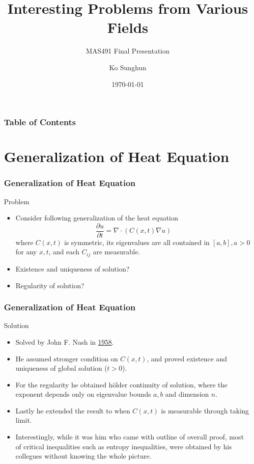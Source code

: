\documentclass{beamer}
\title{Interesting Problems from Various Fields}
\subtitle{MAS491 Final Presentation}
\author{Ko Sunghun}
\institute{KAIST}
\date{\today}
\begin{document}
\begin{frame}
    \titlepage
\end{frame}
\begin{frame}
    \frametitle{Table of Contents}
    \tableofcontents
\end{frame}

\section{Generalization of Heat Equation}
\begin{frame}
    \frametitle{Generalization of Heat Equation}
    \begin{block}{Problem}
        \begin{itemize}
            \item Consider following generalization of the heat equation
            \begin{equation}
                \frac{\partial u}{\partial t} = \nabla \cdot (C(x,t) \nabla u)
            \end{equation}
            where $C(x,t)$ is symmetric, its eigenvalues are all contained in $[a,b], a > 0$ for any $x,t$, and each $C_{ij}$ are measurable.
            \item Existence and uniqueness of solution?
            \item Regularity of solution?
        \end{itemize}
    \end{block}
\end{frame}
\begin{frame}
    \frametitle{Generalization of Heat Equation}
    \begin{block}{Solution}
        \begin{itemize}
            \item Solved by John F. Nash in \href{https://www.karlin.mff.cuni.cz/~kaplicky/pages/pages/2011z/Nash1958.pdf}{1958}.
            \item He assumed stronger condition on $C(x,t)$, and proved existence and uniqueness of global solution ($t > 0$).
            \item For the regularity he obtained h{\"o}lder continuity of solution, where the exponent depends only on eigenvalue bounds $a,b$ and dimension $n$.
            \item Lastly he extended the result to when $C(x,t)$ is measurable through taking limit.
            \item Interestingly, while it was him who came with outline of overall proof, most of critical inequalities such as entropy inequalities, were obtained by his collegues without knowing the whole picture.
        \end{itemize}
    \end{block}
\end{frame}
\end{document}
